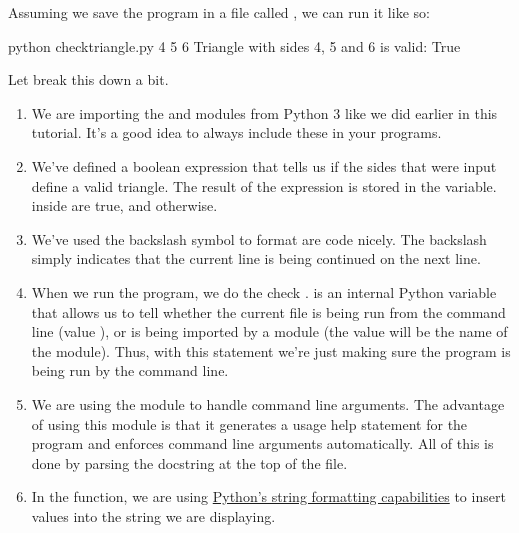 Assuming we save the program in a file called ,
we can run it like so:

\begin{sphinxVerbatim}[commandchars=\\\{\}]
\PYGZdl{} python check\PYGZus{}triangle.py 4 5 6
Triangle with sides 4, 5 and 6 is valid: True
\end{sphinxVerbatim}

Let break this down a bit.
\begin{enumerate}
\item {} 
We are importing the  and  modules
from Python 3 like we did earlier in this tutorial. It's a good
idea to always include these in your programs.

\item {} 
We've defined a boolean expression that tells us if the sides that
were input define a valid triangle. The result of the expression is
stored in the  variable.  inside are true, and
 otherwise.

\item {} 
We've used the backslash symbol \sphinxcode{\textbackslash{}} to format are code
nicely. The backslash simply indicates that the current line is
being continued on the next line.

\item {} 
When we run the program, we do the check .  is an internal Python variable that
allows us to tell whether the current file is being run from the
command line (value ), or is being imported by a module
(the value will be the name of the module). Thus, with this
statement we're just making sure the program is being run by the
command line.

\item {} 
We are using the  module to handle command line
arguments. The advantage of using this module is that it generates
a usage help statement for the program and enforces command line
arguments automatically. All of this is done by parsing the
docstring at the top of the file.

\item {} 
In the  function, we are using \href{https://docs.python.org/2/library/string.html\#format-string-syntax}{Python's string formatting
capabilities}
to insert values into the string we are displaying.

\end{enumerate}


